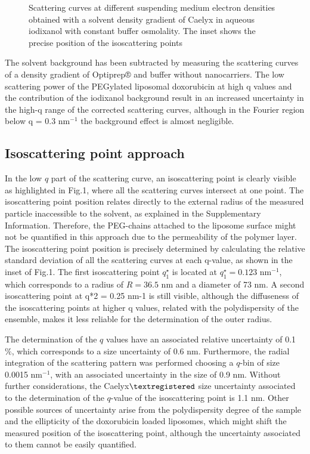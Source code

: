 \begin{figure}
	\centering
		\caption{Scattering curves at different suspending medium electron densities obtained with a solvent density gradient of Caelyx in aqueous iodixanol with constant buffer osmolality. The inset shows the precise position of the isoscattering points}
\end{figure}

The solvent background has been subtracted by measuring the scattering curves of a density gradient of Optiprep® and buffer without nanocarriers. The low scattering power of the PEGylated liposomal doxorubicin at high q values and the contribution of the iodixanol background  result in an increased uncertainty in the high-q range of the corrected scattering curves, although in the Fourier region below q = 0.3 nm$^{-1}$ the background effect is almost negligible.

\subsection{Isoscattering point approach}
In the low $q$ part of the scattering curve, an isoscattering point is clearly visible as highlighted in Fig.1, where all the scattering curves intersect at one point. The isoscattering point position relates directly to the external radius of the measured particle inaccessible to the solvent, as explained in the Supplementary Information. Therefore, the PEG-chains attached to the liposome surface might not be quantified in this approach due to the permeability of the polymer layer. The isoscattering point position is precisely determined by calculating the relative standard deviation of all the scattering curves at each q-value, as shown in the inset of Fig.1. The first isoscattering point $q^{\star}_1$ is located at $q^{\star}_1 = 0.123$ nm$^{-1}$, which corresponds to a radius of $R = 36.5$ nm and a diameter of 73 nm. A second isoscattering point at q*2 = 0.25 nm-1 is still visible, although the diffuseness of the isoscattering points at higher q values, related with the polydispersity of the ensemble, makes it less reliable for the determination of the outer radius.

The determination of the $q$ values have an associated relative uncertainty of 0.1 $\%$, which corresponds to a size uncertainty of 0.6 nm. Furthermore, the radial integration of the scattering pattern was performed choosing a $q$-bin of size 0.0015 nm$^{-1}$, with an associated uncertainty in the size of 0.9 nm. Without further considerations, the Caelyx$\textregistered$ size uncertainty associated to the determination of the $q$-value of the isoscattering point is 1.1 nm. Other possible sources of uncertainty arise from the polydispersity degree of the sample and the ellipticity of the doxorubicin loaded liposomes, which might shift the measured position of the isoscattering point, although the uncertainty associated to them cannot be easily quantified. 

